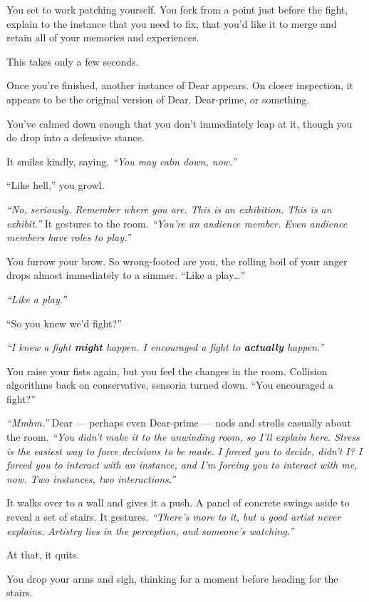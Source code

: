 You set to work patching yourself. You fork from a point just before the fight, explain to the instance that you need to fix, that you'd like it to merge and retain all of your memories and experiences.

This takes only a few seconds.

Once you're finished, another instance of Dear appears. On closer inspection, it appears to be the original version of Dear. Dear-prime, or something.

You've calmed down enough that you don't immediately leap at it, though you do drop into a defensive stance.

It smiles kindly, saying, \emph{``You may calm down, now.''}

``Like hell,'' you growl.

\emph{``No, seriously. Remember where you are. This is an exhibition. This is an exhibit.''} It gestures to the room. \emph{``You're an audience member. Even audience members have roles to play.''}

You furrow your brow. So wrong-footed are you, the rolling boil of your anger drops almost immediately to a simmer. ``Like a play\ldots{}''

\emph{``Like a play.''}

``So you knew we'd fight?''

\emph{``I knew a fight \textbf{might} happen. I encouraged a fight to \textbf{actually} happen.''}

You raise your fists again, but you feel the changes in the room. Collision algorithms back on conservative, sensoria turned down. ``You encouraged a fight?''

\emph{``Mmhm.''} Dear --- perhaps even Dear-prime --- nods and strolls casually about the room. \emph{``You didn't make it to the unwinding room, so I'll explain here. Stress is the easiest way to force decisions to be made. I forced you to decide, didn't I? I forced you to interact with an instance, and I'm forcing you to interact with me, now. Two instances, two interactions.''}

It walks over to a wall and gives it a push. A panel of concrete swings aside to reveal a set of stairs.  It gestures. \emph{``There's more to it, but a good artist never explains. Artistry lies in the perception, and someone's watching.''}

At that, it quits.

You drop your arms and sigh, thinking for a moment before heading for the stairs.

